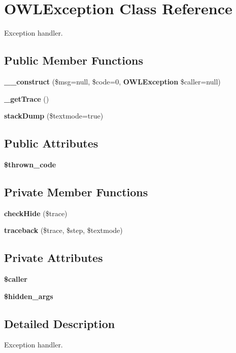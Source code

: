 \section{OWLException Class Reference}
\label{classOWLException}


Exception handler.  


\subsection*{Public Member Functions}
\begin{DoxyCompactItemize}
\item 
{\bf \_\-\_\-construct} (\$msg=null, \$code=0, {\bf OWLException} \$caller=null)
\item 
{\bf \_\-getTrace} ()
\item 
{\bf stackDump} (\$textmode=true)
\end{DoxyCompactItemize}
\subsection*{Public Attributes}
\begin{DoxyCompactItemize}
\item 
{\bf \$thrown\_\-code}
\end{DoxyCompactItemize}
\subsection*{Private Member Functions}
\begin{DoxyCompactItemize}
\item 
{\bf checkHide} (\$trace)
\item 
{\bf traceback} (\$trace, \$step, \$textmode)
\end{DoxyCompactItemize}
\subsection*{Private Attributes}
\begin{DoxyCompactItemize}
\item 
{\bf \$caller}
\item 
{\bf \$hidden\_\-args}
\end{DoxyCompactItemize}


\subsection{Detailed Description}
Exception handler. 

